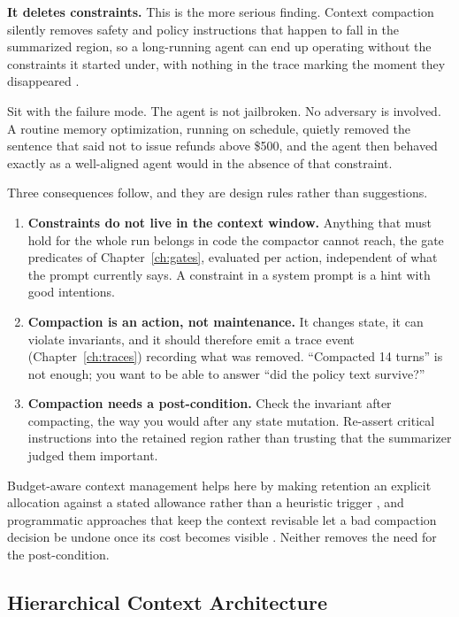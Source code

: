 \textbf{It deletes constraints.} This is the more serious finding. Context
compaction silently removes safety and policy instructions that happen to fall in
the summarized region, so a long-running agent can end up operating without the
constraints it started under, with nothing in the trace marking the moment they
disappeared \cite{govdecay2026}.

Sit with the failure mode. The agent is not jailbroken. No adversary is involved.
A routine memory optimization, running on schedule, quietly removed the sentence
that said not to issue refunds above \$500, and the agent then behaved exactly as
a well-aligned agent would in the absence of that constraint.

Three consequences follow, and they are design rules rather than suggestions.

\begin{enumerate}
\item \textbf{Constraints do not live in the context window.} Anything that must
hold for the whole run belongs in code the compactor cannot reach, the gate
predicates of Chapter~\ref{ch:gates}, evaluated per action, independent of what
the prompt currently says. A constraint in a system prompt is a hint with good
intentions.

\item \textbf{Compaction is an action, not maintenance.} It changes state, it can
violate invariants, and it should therefore emit a trace event
(Chapter~\ref{ch:traces}) recording what was removed. ``Compacted 14 turns'' is
not enough; you want to be able to answer ``did the policy text survive?''

\item \textbf{Compaction needs a post-condition.} Check the invariant after
compacting, the way you would after any state mutation. Re-assert critical
instructions into the retained region rather than trusting that the summarizer
judged them important.
\end{enumerate}

Budget-aware context management helps here by making retention an explicit
allocation against a stated allowance rather than a heuristic trigger
\cite{contextbudget2026}, and programmatic approaches that keep the context
revisable let a bad compaction decision be undone once its cost becomes visible
\cite{contextenv2026, acmgmt2026}. Neither removes the need for the post-condition.

\subsection{Hierarchical Context Architecture}

